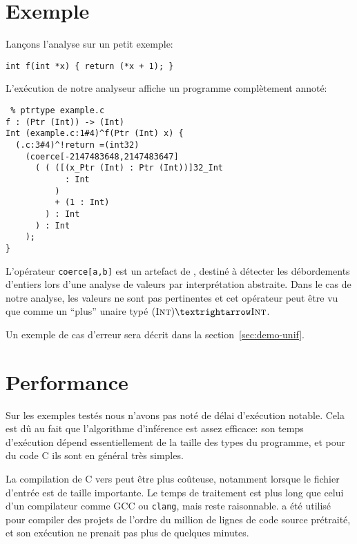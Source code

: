 \section{Exemple}

Lançons l'analyse sur un petit exemple:

\begin{verbatim}
int f(int *x) { return (*x + 1); }
\end{verbatim}

L'exécution de notre analyseur affiche un programme complètement annoté:

\begin{verbatim}
 % ptrtype example.c
f : (Ptr (Int)) -> (Int)
Int (example.c:1#4)^f(Ptr (Int) x) {
  (.c:3#4)^!return =(int32)
    (coerce[-2147483648,2147483647]
      ( ( ([(x_Ptr (Int) : Ptr (Int))]32_Int
            : Int
          )
          + (1 : Int)
        ) : Int
      ) : Int
    );
}
\end{verbatim}

L'opérateur \texttt{coerce[a,b]} est un artefact de \newspeak, destiné à
détecter les débordements d'entiers lors d'une analyse de valeurs par
interprétation abstraite. Dans le cas de notre analyse, les valeurs ne sont pas
pertinentes et cet opérateur peut être vu que comme un \enquote{plus} unaire
typé $(\tInt) → \tInt$.

Un exemple de cas d'erreur sera décrit dans la section~\ref{sec:demo-unif}.

\section{Performance}


Sur les exemples testés nous n'avons pas noté de délai d'exécution notable. Cela
est dû au fait que l'algorithme d'inférence est assez efficace: son temps
d'exécution dépend essentiellement de la taille des types du programme, et pour
du code C ils sont en général très simples.

La compilation de C vers \newspeak peut être plus coûteuse, notamment lorsque
le fichier d'entrée est de taille importante. Le temps de traitement est plus
long que celui d'un compilateur comme GCC ou \texttt{clang}, mais reste
raisonnable. \ctonewspeak a été utilisé pour compiler des projets de l'ordre du
million de lignes de code source prétraité, et son exécution ne prenait pas plus
de quelques minutes.

